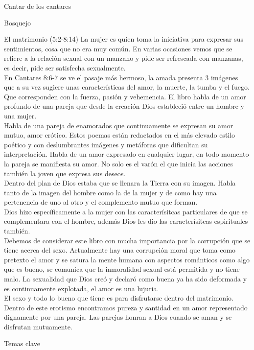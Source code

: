 \begin{section}{Cantar de los cantares}
\begin{subsection}{Bosquejo}
\begin{subsubsection}{El matrimonio (5:2-8:14)}
			La mujer es quien toma la iniciativa para expresar sus sentimientos, cosa que no era muy común. En varias ocasiones vemos que se refiere a la relación sexual con un manzano y pide ser refrescada con manzanas, es decir, pide ser satisfecha sexualmente. \\
			En Cantares 8:6-7 se ve el pasaje más hermoso, la amada presenta 3 imágenes que a su vez sugiere unas características del amor, la muerte, la tumba y el fuego. Que corresponden con la fuerza, pasión y vehemencia.
			\newpage
			El libro habla de un amor profundo de una pareja que desde la creación Dios estableció entre un hombre y una mujer.\\
			Habla de una pareja de enamorados que continuamente se expresan su amor mutuo, amor erótico. Estos poemas están redactados en el más elevado estilo poético y con deslumbrantes imágenes y metáforas que dificultan su interpretación. Habla de un amor expresado en cualquier lugar, en todo momento la pareja se manifiesta su amor. No solo es el varón el que inicia las acciones también la joven que expresa sus deseos.\\
		 Dentro del plan de Dios estaba que se llenara la Tierra con su imagen. Habla tanto de la imagen del hombre como la de la mujer y de como hay una pertenencia de uno al otro y el complemento mutuo que forman.\\
			Dios hizo específicamente a la mujer con las caracterísitcas particulares de que se complementara con el hombre, además Dios les dio las caracterísitcas espirituales también.\\
			Debemos de considerar este libro con mucha importancia por la corrupción que se tiene acerca del sexo. Actualmente hay una corrupción moral que toma como pretexto el amor y se satura la mente humana con aspectos románticos como algo que es bueno, se comunica que la inmoralidad sexual está permitida y no tiene malo. La sexualidad que Dios creó y declaró como buena ya ha sido deformada y es continuamente explotada, el amor es una lujuria.\\
			El sexo y todo lo bueno que tiene es para disfrutarse dentro del matrimonio. Dentro de este erotismo encontramos pureza y santidad en un amor representado dignamente por una pareja. Las parejas honran a Dios cuando se aman y se disfrutan mutuamente. 
		\end{subsubsection}
	\end{subsection}
	\begin{subsection}{Temas clave}
		\begin{itemize}

\end{itemize}
\end{subsection}
\end{section}
